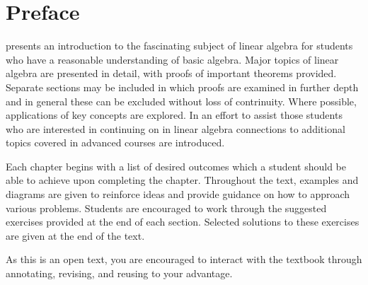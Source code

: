 \chapter*{Preface}

\textit{\bookfulltitle} presents an introduction to the fascinating subject of linear algebra for students who have a reasonable understanding of basic algebra. Major topics of linear algebra are presented in detail, with proofs of important theorems provided. Separate sections may be included in which proofs are examined in further depth and in general these can be excluded without loss of contrinuity. Where possible, applications of key concepts are explored. In an effort to assist those students who are interested in continuing on in linear algebra connections to additional topics covered in advanced courses are introduced.

Each chapter begins with a list of desired outcomes which a student should be able to achieve upon completing the chapter.  Throughout the text, examples
and diagrams are given to reinforce ideas and provide guidance on how
to approach various problems. Students are encouraged to work through the suggested exercises provided at the end of each section. Selected solutions to these exercises are given at the end of the text. 

As this is an open text, you are encouraged to interact with the textbook through annotating, revising, and reusing to your advantage. 
\newpage
